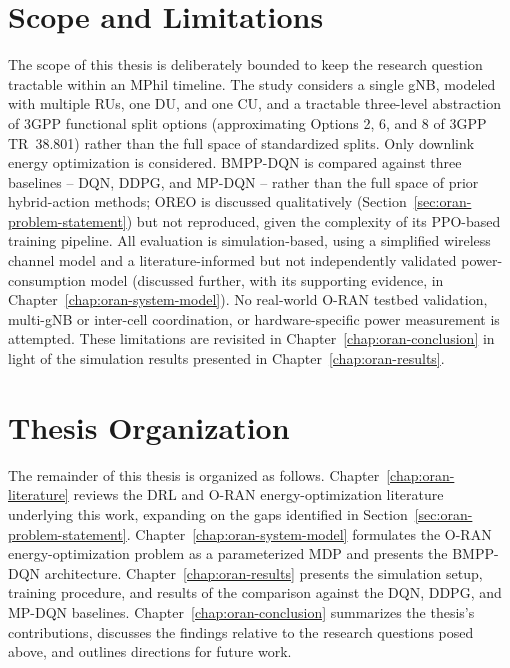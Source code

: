 \section{Scope and Limitations}
\label{sec:oran-scope}

The scope of this thesis is deliberately bounded to keep the research
question tractable within an MPhil timeline. The study considers a single
gNB, modeled with multiple RUs, one DU, and one CU, and a tractable
three-level abstraction of 3GPP functional split options (approximating
Options 2, 6, and 8 of 3GPP TR~38.801) rather than the full space of
standardized splits. Only downlink energy optimization is considered.
BMPP-DQN is compared against three baselines -- DQN, DDPG, and MP-DQN --
rather than the full space of prior hybrid-action methods; OREO is discussed
qualitatively (Section~\ref{sec:oran-problem-statement}) but not reproduced,
given the complexity of its PPO-based training pipeline. All evaluation is
simulation-based, using a simplified wireless channel model and a
literature-informed but not independently validated power-consumption model
(discussed further, with its supporting evidence, in
Chapter~\ref{chap:oran-system-model}). No real-world O-RAN testbed
validation, multi-gNB or inter-cell coordination, or hardware-specific power
measurement is attempted. These limitations are revisited in
Chapter~\ref{chap:oran-conclusion} in light of the simulation results
presented in Chapter~\ref{chap:oran-results}.

\section{Thesis Organization}
\label{sec:oran-organization}

The remainder of this thesis is organized as follows.
Chapter~\ref{chap:oran-literature} reviews the DRL and O-RAN
energy-optimization literature underlying this work, expanding on the gaps
identified in Section~\ref{sec:oran-problem-statement}.
Chapter~\ref{chap:oran-system-model} formulates the O-RAN energy-optimization
problem as a parameterized MDP and presents the BMPP-DQN architecture.
Chapter~\ref{chap:oran-results} presents the simulation setup, training
procedure, and results of the comparison against the DQN, DDPG, and MP-DQN
baselines. Chapter~\ref{chap:oran-conclusion} summarizes the thesis's
contributions, discusses the findings relative to the research questions
posed above, and outlines directions for future work.

